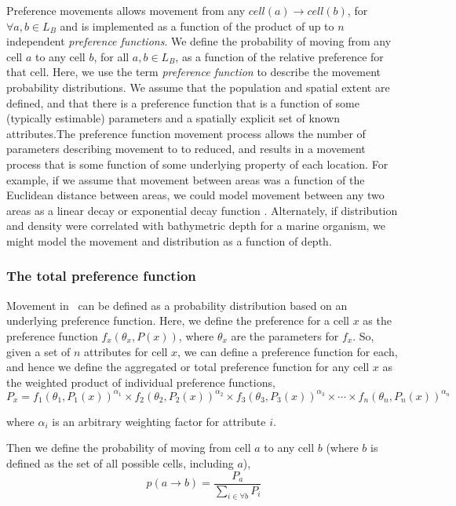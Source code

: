 Preference movements allows movement from any $cell(a) \rightarrow cell(b)$, for $\forall a,b \in L_B$ and is implemented as a function of the product of up to $n$ independent \emph{preference functions}. We define the probability of moving from any cell $a$ to any cell $b$, for all $a,b \in L_B$, as a function of the relative preference for that cell. Here, we use the term \emph{preference function} \citep{1366,1367} to describe the movement probability distributions. We assume that the population and spatial extent are defined, and that there is a preference function that is a function of some (typically estimable) parameters and a spatially explicit set of known attributes.The preference function movement process allows the number of parameters describing movement to to reduced, and results in a movement process that is some function of some underlying property of each location. For example, if we assume that movement between areas was a function of the Euclidean distance between areas, we could model movement between any two areas as a linear decay or exponential decay function \citep{1366}. Alternately, if distribution and density were correlated with bathymetric depth for a marine organism, we might model the movement and distribution as a function of depth. 

\subsubsection*{The total preference function}

Movement in \SPM\ can be defined as a probability distribution based on an underlying preference function. Here, we define the preference for a cell $x$ as the preference function $f_x(\theta_x,P(x))$, where $\theta_x$ are the parameters for $f_x$. So, given a set of $n$ attributes for cell $x$, we can define a preference function for each, and hence we define the aggregated or total preference function for any cell $x$ as the weighted product of individual preference functions,
\begin{equation}
  P_x=f_1(\theta_1,P_1(x))^{\alpha_1} \times f_2(\theta_2,P_2(x))^{\alpha_2} \times f_3(\theta_3,P_3(x))^{\alpha_3} \times \cdots \times f_n(\theta_n,P_n(x))^{\alpha_n}
\end{equation}

where $\alpha_i$ is an arbitrary weighting factor for attribute $i$.

Then we define the probability of moving from cell $a$ to any cell $b$ (where $b$ is defined as the set of all possible cells, including $a$),
\begin{equation}
  p(a\rightarrow b) = \frac{P_a}{\sum\limits_{i \in \forall b} P_i}
\end{equation}


